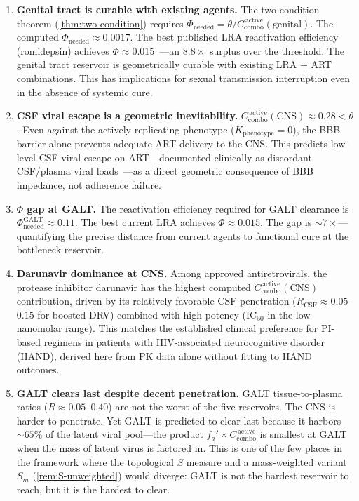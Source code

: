\documentclass[11pt]{article}
\theoremstyle{plain}
\theoremstyle{definition}
\newcommand{\Kpheno}{K_{\mathrm{phenotype}}}
\newcommand{\Ccombo}{C_{\mathrm{combo}}}
\begin{document}
\begin{enumerate}
  \item \textbf{Genital tract is curable with existing agents.}
    The two-condition theorem (\cref{thm:two-condition}) requires
    $\Phi_{\mathrm{needed}} = \theta /
    \Ccombo^{\,\mathrm{active}}(\mathrm{genital})$. The computed
    $\Phi_{\mathrm{needed}} \approx 0.0017$. The best published
    LRA reactivation efficiency (romidepsin) achieves
    $\Phi \approx 0.015$~\cite{Rasmussen2014}---an $8.8\times$
    surplus over the threshold. The genital tract reservoir is
    geometrically curable with existing LRA + ART combinations.
    This has implications for sexual transmission interruption
    even in the absence of systemic cure.

  \item \textbf{CSF viral escape is a geometric inevitability.}
    $\Ccombo^{\,\mathrm{active}}(\mathrm{CNS}) \approx 0.28 <
    \theta$. Even against the actively replicating phenotype
    ($\Kpheno = 0$), the BBB barrier alone prevents adequate ART
    delivery to the CNS. This predicts low-level CSF viral escape
    on ART---documented clinically as discordant CSF/plasma
    viral loads~\cite{Canestri2010, Peluso2012}---as a direct
    geometric consequence of BBB impedance, not adherence failure.

  \item \textbf{$\Phi$ gap at GALT.}
    The reactivation efficiency required for GALT clearance is
    $\Phi_{\mathrm{needed}}^{\mathrm{GALT}} \approx 0.11$. The best
    current LRA achieves $\Phi \approx 0.015$. The gap is
    ${\sim}7\times$---quantifying the precise distance from
    current agents to functional cure at the bottleneck
    reservoir.

  \item \textbf{Darunavir dominance at CNS.}
    Among approved antiretrovirals, the protease inhibitor
    darunavir has the highest computed
    $\Ccombo^{\,\mathrm{active}}(\mathrm{CNS})$ contribution,
    driven by its relatively favorable CSF penetration
    ($R_{\mathrm{CSF}} \approx 0.05$--$0.15$ for boosted DRV)
    combined with high potency ($\mathrm{IC}_{50}$ in the low
    nanomolar range). This matches the established clinical
    preference for PI-based regimens in patients with
    HIV-associated neurocognitive disorder (HAND), derived here
    from PK data alone without fitting to HAND outcomes.

  \item \textbf{GALT clears last despite decent penetration.}
    GALT tissue-to-plasma ratios ($R \approx 0.05$--$0.40$) are
    not the worst of the five reservoirs. The CNS is harder to
    penetrate. Yet GALT is predicted to clear last because it
    harbors ${\sim}65\%$ of the latent viral pool---the product
    $f_a' \times \Ccombo^{\,\mathrm{active}}$ is smallest at GALT
    when the mass of latent virus is factored in. This is one of
    the few places in the framework where the topological $S$
    measure and a mass-weighted variant $S_m$
    (\cref{rem:S-unweighted}) would diverge: GALT is not the
    hardest reservoir to reach, but it is the hardest to clear.
\end{enumerate}
\end{document}
